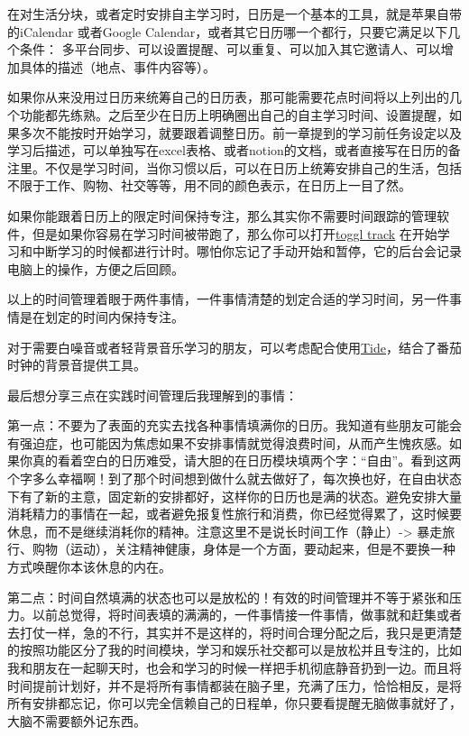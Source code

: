 \documentclass[
]{book}
\begin{document}
在对生活分块，或者定时安排自主学习时，日历是一个基本的工具，就是苹果自带的iCalendar 或者Google Calendar，或者其它日历哪一个都行，只要它满足以下几个条件：
多平台同步、可以设置提醒、可以重复、可以加入其它邀请人、可以增加具体的描述（地点、事件内容等）。

如果你从来没用过日历来统筹自己的日历表，那可能需要花点时间将以上列出的几个功能都先练熟。之后至少在日历上明确圈出自己的自主学习时间、设置提醒，如果多次不能按时开始学习，就要跟着调整日历。前一章提到的学习前任务设定以及学习后描述，可以单独写在excel表格、或者notion的文档，或者直接写在日历的备注里。不仅是学习时间，当你习惯以后，可以在日历上统筹安排自己的生活，包括不限于工作、购物、社交等等，用不同的颜色表示，在日历上一目了然。

如果你能跟着日历上的限定时间保持专注，那么其实你不需要时间跟踪的管理软件，但是如果你容易在学习时间被带跑了，那么你可以打开\href{https://toggl.com/track/}{toggl track} 在开始学习和中断学习的时候都进行计时。哪怕你忘记了手动开始和暂停，它的后台会记录电脑上的操作，方便之后回顾。

以上的时间管理着眼于两件事情，一件事情清楚的划定合适的学习时间，另一件事情是在划定的时间内保持专注。

对于需要白噪音或者轻背景音乐学习的朋友，可以考虑配合使用\href{https://tide.fm/}{Tide}，结合了番茄时钟的背景音提供工具。

最后想分享三点在实践时间管理后我理解到的事情：

第一点：不要为了表面的充实去找各种事情填满你的日历。我知道有些朋友可能会有强迫症，也可能因为焦虑如果不安排事情就觉得浪费时间，从而产生愧疚感。如果你真的看着空白的日历难受，请大胆的在日历模块填两个字：``自由''。看到这两个字多么幸福啊！到了那个时间想到做什么就去做好了，每次换也好，在自由状态下有了新的主意，固定新的安排都好，这样你的日历也是满的状态。避免安排大量消耗精力的事情在一起，或者避免报复性旅行和消费，你已经觉得累了，这时候要休息，而不是继续消耗你的精神。注意这里不是说长时间工作（静止）-\textgreater{} 暴走旅行、购物（运动），关注精神健康，身体是一个方面，要动起来，但是不要换一种方式唤醒你本该休息的内在。

第二点：时间自然填满的状态也可以是放松的！有效的时间管理并不等于紧张和压力。以前总觉得，将时间表填的满满的，一件事情接一件事情，做事就和赶集或者去打仗一样，急的不行，其实并不是这样的，将时间合理分配之后，我只是更清楚的按照功能区分了我的时间模块，学习和娱乐社交都可以是放松并且专注的，比如我和朋友在一起聊天时，也会和学习的时候一样把手机彻底静音扔到一边。而且将时间提前计划好，并不是将所有事情都装在脑子里，充满了压力，恰恰相反，是将所有安排都忘记，你可以完全信赖自己的日程单，你只要看提醒无脑做事就好了，大脑不需要额外记东西。
\end{document}
